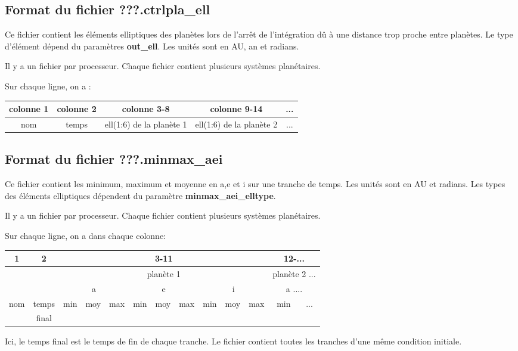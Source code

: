 \documentclass[11pt]{article}
\begin{document}
\subsection{Format du fichier  {\bf ???.ctrlpla\_ell}}

Ce fichier contient les \'el\'ements elliptiques des plan\`etes lors de l'arr\^et de l'int\'egration d\^u \`a une distance trop proche entre plan\`etes. Le type d'\'el\'ement d\'epend du param\`etres  {\bf out\_ell}. Les unit\'es sont en AU, an et radians.

 Il y a un fichier par processeur. Chaque fichier contient plusieurs syst\`emes plan\'etaires.

Sur chaque ligne, on a : 

\begin{tabular}{|c|c|c|c|c|} \hline
colonne 1 &   colonne 2 & colonne 3-8 & colonne 9-14 & ... \\ \hline
nom & temps & ell(1:6) de la plan\`ete 1  & ell(1:6) de la plan\`ete 2 & ... \\    \hline
\end{tabular}

\subsection{Format du fichier {\bf ???.minmax\_aei} }

Ce fichier contient les minimum, maximum et moyenne en a,e et i sur une tranche de temps. Les unit\'es sont en AU et radians.
Les types des \'el\'ements elliptiques d\'ependent du param\`etre  {\bf minmax\_aei\_elltype}.

 Il y a un fichier par processeur. Chaque fichier contient plusieurs syst\`emes plan\'etaires.
 
 
Sur chaque ligne, on a dans chaque colonne: 

\begin{tabular}{|c|c|c|c|c|c|c|c|c|c|c|c|c|} \hline
 1 &    2 &  \multicolumn{9}{c|}{3-11} & \multicolumn{2}{c|}{12-...} \\ \hline
  &    &  \multicolumn{9}{c|}{plan\`ete 1} &  \multicolumn{2}{c|}{plan\`ete 2 ...} \\ \hline
  &    &  \multicolumn{3}{c|}{a} & \multicolumn{3}{c|}{e} & \multicolumn{3}{c|}{i} & \multicolumn{2}{c|}{a ....} \\ \hline
nom & temps &  min   &moy & max  &  min   & moy & max   & min   & moy & max &  min &... \\  
 & final &     & &   &     &  &    &    &  &  &   &
\\\hline
\end{tabular}
 Ici, le temps final est le temps de fin de chaque tranche. Le fichier contient toutes les tranches d'une m\^eme  condition initiale.
\end{document}
